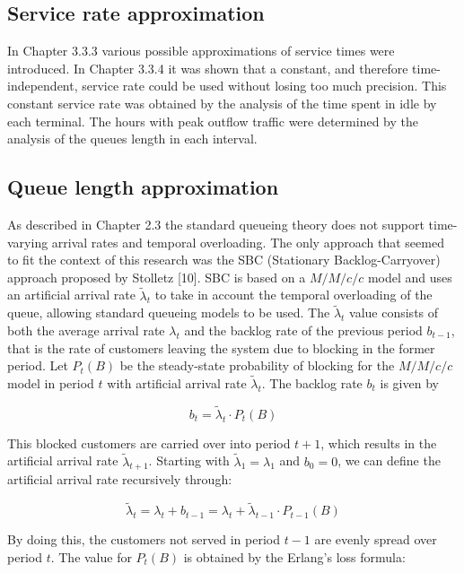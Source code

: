 \subsection{Service rate approximation}
\label{subsec:service_rate_approximation}
In Chapter 3.3.3 various possible approximations of service times were introduced. In Chapter 3.3.4 it was shown that a constant, and therefore time-independent, service rate could be used without losing too much precision. This constant service rate was obtained by the analysis of the time spent in idle by each terminal. The hours with peak outflow traffic were determined by the analysis of the queues length in each interval.

\subsection{Queue length approximation}
\label{subsec:queue_length_approximation}
As described in Chapter 2.3 the standard queueing theory does not support time-varying arrival rates and temporal overloading. The only approach that seemed to fit the context of this research was the SBC (Stationary Backlog-Carryover) approach proposed by Stolletz [10]. SBC is based on a $ M/M/c/c $ model and uses an artificial arrival rate $ \widetilde{\lambda}_t $ to take in account the temporal overloading of the queue, allowing standard queueing models to be used. The $ \widetilde{\lambda}_t $ value consists of both the average arrival rate $ \lambda_t $ and the backlog rate of the previous period $ b_{t-1} $, that is the rate of customers leaving the system due to blocking in the former period.
Let $ P_t(B) $ be the steady-state probability of blocking for the $ M/M/c/c $model in period $ t $ with artificial arrival rate $ \widetilde{\lambda}_t $. The backlog rate $ b_t $ is given by

$$ b_t = \widetilde{\lambda}_t \cdot P_t(B) $$

This blocked customers are carried over into period $ t+1$, which results in the artificial arrival rate $ \widetilde{\lambda}_{t+1} $.
Starting with $ \widetilde{\lambda}_1 = \lambda_1 $ and $ b_0 = 0 $, we can define the artificial arrival rate recursively through:

$$ \widetilde{\lambda}_t = \lambda_t + b_{t-1} = \lambda_t + \widetilde{\lambda}_{t-1} \cdot P_{t-1}(B) $$

By doing this, the customers not served in period $ t-1 $ are evenly spread over period $ t $. The value for $ P_t(B) $ is obtained by the Erlang’s loss formula:

